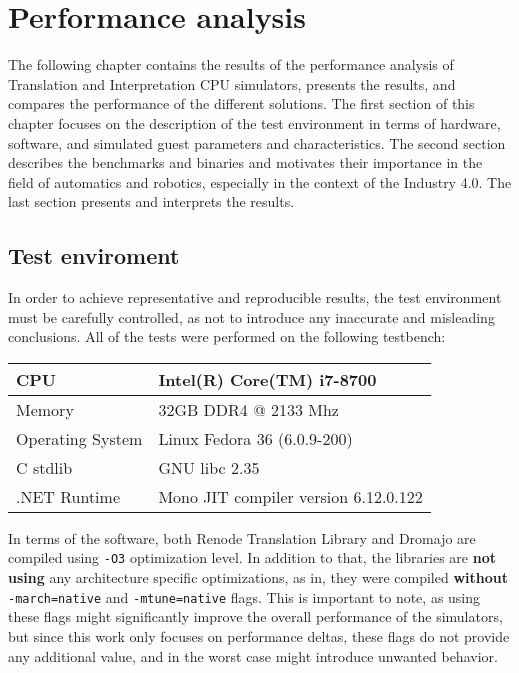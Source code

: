 \chapter{Performance analysis}

The following chapter contains the results of the performance analysis of Translation and Interpretation CPU simulators,
presents the results, and compares the performance of the different solutions. The first section of this chapter focuses
on the description of the test environment in terms of hardware, software, and simulated guest parameters and
characteristics. The second section describes the benchmarks and binaries and motivates their importance in the field
of automatics and robotics, especially in the context of the Industry 4.0. The last section presents and interprets
the results.

\section{Test enviroment}
In order to achieve representative and reproducible results, the test environment must be carefully controlled, as not
to introduce any inaccurate and misleading conclusions. All of the tests were performed on the following testbench:

\begin{table}[h!]
    \centering
    \begin{tabular}{l|l}
    CPU              & Intel(R) Core(TM) i7-8700             \\
    \hline
    Memory           & 32GB DDR4 @ 2133 Mhz                  \\
    \hline
    Operating System & Linux Fedora 36 (6.0.9-200)           \\
    \hline
    C stdlib         & GNU libc 2.35                         \\
    \hline
    .NET Runtime     & Mono JIT compiler version 6.12.0.122
    \end{tabular}
\end{table}

\noindent
In terms of the software, both Renode Translation Library and Dromajo are compiled using \texttt{-O3} optimization
level. In addition to that, the libraries are \textbf{not using} any architecture specific optimizations, as in,
they were compiled \textbf{without} \texttt{-march=native} and \texttt{-mtune=native} flags. This is important
to note, as using these flags might significantly improve the overall performance of the simulators, but since
this work only focuses on performance deltas, these flags do not provide any additional value, and in the worst
case might introduce unwanted behavior.

